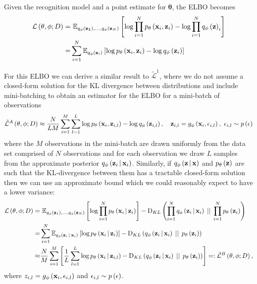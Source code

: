 \documentclass[../report.tex]{subfiles}
\begin{document}
Given the recognition model and a point estimate for $\mathbf{\theta}$, the ELBO becomes
\begin{align}
  \mathcal{L} \left( \mathbf{\theta}, \phi; D\right) =& \,\, \mathbb{E}_{q_\phi \left( \mathbf{z_1}\right),...,q_\phi \left( \mathbf{z}_N\right)} \left[ \log \prod_{i=1}^{N} p_\mathbf{\theta} \left( \mathbf{x}_i, \mathbf{z}_i\right) - \log \prod_{i=1}^{N} q_\phi \left( \mathbf{z}\right)_i \right] \nonumber \\
  =& \sum_{i=1}^{N} \mathbb{E}_{q_\phi \left( \mathbf{z}_i\right)} \left[ \log p_\mathbf{\theta} \left( \mathbf{x}_i, \mathbf{z}_i\right) - \log q_\phi \left( \mathbf{z}_i\right) \right] \nonumber \\
\end{align}

For this ELBO we can derive a similar result to $\tilde{\mathcal{L}}^1$, where we do not assume a closed-form solution for the KL divergence between distributions and include mini-batching to obtain an estimator for the ELBO for a mini-batch of observations
\begin{equation}
  \tilde{\mathcal{L}}^A \left( \mathbf{\theta}, \phi; D\right) \approx \frac{N}{LM} \sum_{i=1}^{M} \sum_{l=1}^{L} \log p_\mathbf{\theta} \left( \mathbf{x}_i, \mathbf{z}_{i,l}\right) - \log q_\phi \left( \mathbf{z}_{i,l}\right), \quad \mathbf{z}_{i,l} = g_\phi \left( \mathbf{x}_i, \mathbf{\epsilon}_{i,l}\right),\,\, \mathbf{\epsilon}_{i,l} \sim p \left( \mathbf{\epsilon}\right)
\end{equation}
where the $M$ observations in the mini-batch are drawn uniformly from the data set comprised of $N$ observations and for each observation we draw $L$ samples from the approximate posterior $q_\phi \left(\mathbf{z}_i \, \middle\vert \, \mathbf{x}_i \right)$.
Similarly, if $q_\phi \left(\mathbf{z} \, \middle\vert \, \mathbf{x} \right)$ and $p_\mathbf{\theta} \left( \mathbf{z}\right)$ are such that the KL-divergence between them has a tractable closed-form solution then we can use an approximate bound which we could reasonably expect to have a lower variance:
\begin{align}
  \mathcal{L} \left( \mathbf{\theta}, \phi; D\right) =& \,\,\mathbb{E}_{q_\phi \left( \mathbf{z}_1\right),...,q_\phi \left( \mathbf{z}_N\right)} \left[ \log \prod_{i=1}^{N} p_\mathbf{\theta} \left(\mathbf{x}_i \, \middle\vert \, \mathbf{z}_i \right) \right] - \textrm{D}_{KL} \left( \prod_{i=1}^{N} q_\phi \left(\mathbf{z}_i \, \middle\vert \, \mathbf{x}_i \right) \, \mid \mid \, \prod_{i=1}^{N} p_\mathbf{\theta} \left( \mathbf{z}_i\right)\right) \nonumber \\
  =& \sum_{i=1}^{N} \mathbb{E}_{q_\phi \left(\mathbf{z}_i \, \middle\vert \, \mathbf{x}_i \right)} \left[ \log p_\mathbf{\theta} \left(\mathbf{x}_i \, \middle\vert \, \mathbf{z}_i \right) \right] - \textrm{D}_{KL} \left( q_\phi \left(\mathbf{z}_i \, \middle\vert \, \mathbf{x}_i \right) \, \mid \mid \, p_\mathbf{\theta} \left( \mathbf{z}_i\right)\right) \nonumber \\
  \approx& \frac{N}{M} \sum_{i=1}^{M} \left[ \frac{1}{L} \sum_{l=1}^{L} \log p_\mathbf{\theta} \left(\mathbf{x}_i \, \middle\vert \, \mathbf{z}_{i,l} \right) - \textrm{D}_{KL} \left( q_{\phi} \left(\mathbf{z}_i \, \middle\vert \, \mathbf{x}_i \right) \, \mid \mid \, p_\mathbf{\theta} \left( \mathbf{z}_i\right)\right) \right] =: \tilde{\mathcal{L}}^B \left( \mathbf{\theta}, \phi; D\right), \label{eqn:Lb}
\end{align}
where $z_{i,l} = g_\phi \left( \mathbf{x}_i, \mathbf{\epsilon}_{i,l}\right)$ and $\mathbf{\epsilon}_{i,l} \sim p \left( \mathbf{\epsilon}\right)$.
\end{document}

